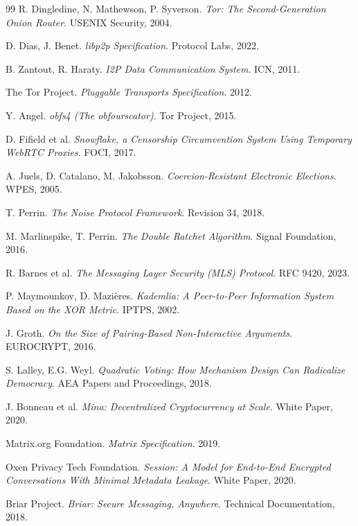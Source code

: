 \documentclass[11pt,a4paper,twocolumn]{article}
\begin{document}
\begin{thebibliography}{99}
R. Dingledine, N. Mathewson, P. Syverson. \emph{Tor: The Second-Generation Onion Router}. USENIX Security, 2004.

D. Dias, J. Benet. \emph{libp2p Specification}. Protocol Labs, 2022.

B. Zantout, R. Haraty. \emph{I2P Data Communication System}. ICN, 2011.

The Tor Project. \emph{Pluggable Transports Specification}. 2012.

Y. Angel. \emph{obfs4 (The obfourscator)}. Tor Project, 2015.

D. Fifield et al. \emph{Snowflake, a Censorship Circumvention System Using Temporary WebRTC Proxies}. FOCI, 2017.

A. Juels, D. Catalano, M. Jakobsson. \emph{Coercion-Resistant Electronic Elections}. WPES, 2005.

T. Perrin. \emph{The Noise Protocol Framework}. Revision 34, 2018.

M. Marlinspike, T. Perrin. \emph{The Double Ratchet Algorithm}. Signal Foundation, 2016.

R. Barnes et al. \emph{The Messaging Layer Security (MLS) Protocol}. RFC 9420, 2023.

P. Maymounkov, D. Mazi\`eres. \emph{Kademlia: A Peer-to-Peer Information System Based on the XOR Metric}. IPTPS, 2002.

J. Groth. \emph{On the Size of Pairing-Based Non-Interactive Arguments}. EUROCRYPT, 2016.

S. Lalley, E.G. Weyl. \emph{Quadratic Voting: How Mechanism Design Can Radicalize Democracy}. AEA Papers and Proceedings, 2018.

J. Bonneau et al. \emph{Mina: Decentralized Cryptocurrency at Scale}. White Paper, 2020.

Matrix.org Foundation. \emph{Matrix Specification}. 2019.

Oxen Privacy Tech Foundation. \emph{Session: A Model for End-to-End Encrypted Conversations With Minimal Metadata Leakage}. White Paper, 2020.

Briar Project. \emph{Briar: Secure Messaging, Anywhere}. Technical Documentation, 2018.


\end{thebibliography}
\end{document}
